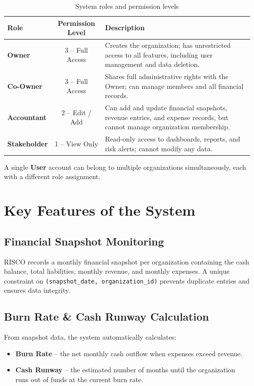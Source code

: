 \documentclass[12pt,a4paper]{article}
\begin{document}
\begin{table}[h!]
\centering
\renewcommand{\arraystretch}{1.4}
\begin{tabular}{>{\bfseries}p{3cm} c p{7.5cm}}
\toprule
Role & Permission Level & Description \\
\midrule
Owner       & 3 – Full Access  & Creates the organization; has unrestricted
                                  access to all features, including user
                                  management and data deletion. \\
Co-Owner    & 3 – Full Access  & Shares full administrative rights with the
                                  Owner; can manage members and all financial
                                  records. \\
Accountant  & 2 – Edit / Add   & Can add and update financial snapshots,
                                  revenue entries, and expense records, but
                                  cannot manage organization membership. \\
Stakeholder & 1 – View Only    & Read-only access to dashboards, reports, and
                                  risk alerts; cannot modify any data. \\
\bottomrule
\end{tabular}
\caption{System roles and permission levels}
\label{tab:roles}
\end{table}

A single \textbf{User} account can belong to multiple organizations
simultaneously, each with a different role assignment.

\section{Key Features of the System}

\subsection{Financial Snapshot Monitoring}
RISCO records a monthly financial snapshot per organization containing the cash
balance, total liabilities, monthly revenue, and monthly expenses. A unique
constraint on \texttt{(snapshot\_date, organization\_id)} prevents duplicate
entries and ensures data integrity.

\subsection{Burn Rate \& Cash Runway Calculation}
From snapshot data, the system automatically calculates:
\begin{itemize}[leftmargin=1.5cm]
    \item \textbf{Burn Rate} – the net monthly cash outflow when expenses
          exceed revenue.
    \item \textbf{Cash Runway} – the estimated number of months until the
          organization runs out of funds at the current burn rate.
\end{itemize}
\end{document}
